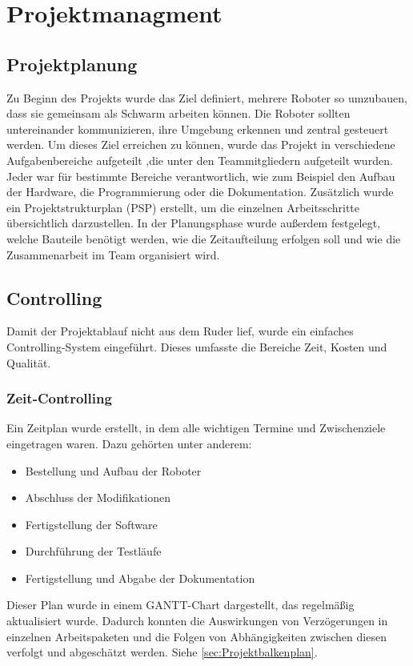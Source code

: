 \section{Projektmanagment}
\label{subsec:projektmanagment}
%
\subsection{Projektplanung}
%

Zu Beginn des Projekts wurde das Ziel definiert, mehrere Roboter so umzubauen, dass sie gemeinsam als Schwarm arbeiten können. Die Roboter sollten untereinander kommunizieren, ihre Umgebung erkennen und zentral gesteuert werden. Um dieses Ziel erreichen zu können, wurde das Projekt in verschiedene Aufgabenbereiche aufgeteilt
,die unter den Teammitgliedern aufgeteilt wurden. Jeder war für bestimmte Bereiche verantwortlich, wie zum Beispiel den Aufbau der Hardware, die Programmierung oder die Dokumentation.
Zusätzlich wurde ein Projektstrukturplan (PSP) erstellt, um die einzelnen Arbeitsschritte übersichtlich darzustellen.
In der Planungsphase wurde außerdem festgelegt, welche Bauteile benötigt werden, wie die Zeitaufteilung erfolgen soll und wie die Zusammenarbeit im Team organisiert wird.
\subsection{Controlling}
Damit der Projektablauf nicht aus dem Ruder lief, wurde ein einfaches Controlling-System eingeführt. Dieses umfasste die Bereiche Zeit, Kosten und Qualität.
\subsubsection{Zeit-Controlling}
Ein Zeitplan wurde erstellt, in dem alle wichtigen Termine und Zwischenziele eingetragen waren.
Dazu gehörten unter anderem:
\begin{itemize}
    \item Bestellung und Aufbau der Roboter
    \item Abschluss der Modifikationen
    \item Fertigstellung der Software
    \item Durchführung der Testläufe
    \item Fertigstellung und Abgabe der Dokumentation
\end{itemize}
Dieser Plan wurde in einem GANTT-Chart dargestellt, das regelmäßig aktualisiert wurde.
Dadurch konnten die Auswirkungen von Verzögerungen in einzelnen Arbeitspaketen und die Folgen von Abhängigkeiten zwischen diesen verfolgt und abgeschätzt werden.
Siehe \ref{sec:Projektbalkenplan}.
